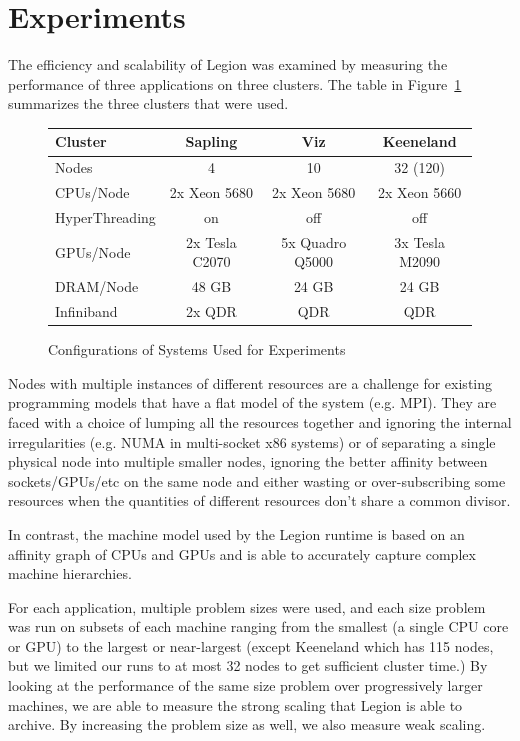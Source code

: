 \section{Experiments}
\label{sec:exp}

The efficiency and scalability of Legion was examined by measuring the performance
of three applications on three clusters.  The table in Figure~\ref{fig:systems} summarizes 
the three clusters that were used.

\begin{figure}
{\footnotesize
\begin{tabular}{l|ccc}
Cluster & Sapling & Viz & Keeneland \\
\midrule
Nodes   &   4     &  10 &  32 (120) \\
CPUs/Node & 2x Xeon 5680 & 2x Xeon 5680 & 2x Xeon 5660 \\
HyperThreading & on & off & off \\
GPUs/Node & 2x Tesla C2070 & 5x Quadro Q5000 & 3x Tesla M2090 \\
DRAM/Node & 48 GB & 24 GB & 24 GB \\
Infiniband & 2x QDR & QDR & QDR \\
\end{tabular}
}
\label{fig:systems}
\caption{Configurations of Systems Used for Experiments}
\end{figure}

Nodes with multiple instances of different resources are a challenge for 
existing programming models that have a flat model of the system (e.g. MPI).
They are faced with a choice of lumping all 
the resources together and ignoring the internal irregularities (e.g. NUMA
in multi-socket x86 systems) or of separating a single physical node into
multiple smaller nodes, ignoring the better affinity between sockets/GPUs/etc
on the same node and either wasting or over-subscribing some resources when
the quantities of different resources don't share a common divisor.

In contrast, the machine model used by the Legion runtime is based on an
affinity graph of CPUs and GPUs and is able to accurately capture complex
machine hierarchies.

For each application, multiple problem sizes were used, and each size problem was
run on subsets of each machine ranging from the smallest (a single CPU core or GPU)
to the largest or near-largest (except Keeneland which has 115 nodes, but we limited 
our runs to at most 32 nodes to get sufficient cluster time.)
By looking at the performance of the same size problem over progressively larger
machines, we are able to measure the strong scaling that Legion is able to
archive.  By increasing the problem size as well, we also measure weak scaling.

